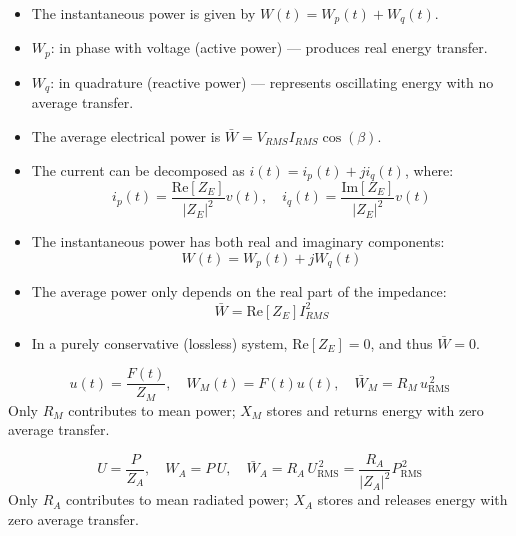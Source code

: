 \begin{tcolorbox}[colback=gray!5,colframe=gray!50!black,title=Key Points]
\begin{itemize}
    \item The instantaneous power is given by \( W(t) = W_p(t) + W_q(t) \).
    \item \( W_p \): in phase with voltage (active power) — produces real energy transfer.
    \item \( W_q \): in quadrature (reactive power) — represents oscillating energy with no average transfer.
    \item The average electrical power is \( \bar{W} = V_{RMS} I_{RMS} \cos(\beta) \).
\end{itemize}
\end{tcolorbox}


\begin{tcolorbox}[colback=gray!5,colframe=gray!50!black,title=Key Points]
\begin{itemize}
    \item The current can be decomposed as \( i(t) = i_p(t) + j i_q(t) \), where:
    \[
    i_p(t) = \frac{\mathrm{Re}[Z_E]}{|Z_E|^2} v(t), \quad i_q(t) = \frac{\mathrm{Im}[Z_E]}{|Z_E|^2} v(t)
    \]
    \item The instantaneous power has both real and imaginary components:
    \[
    W(t) = W_p(t) + j W_q(t)
    \]
    \item The average power only depends on the real part of the impedance:
    \[
    \bar{W} = \mathrm{Re}[Z_E] I_{RMS}^2
    \]
    \item In a purely conservative (lossless) system, \( \mathrm{Re}[Z_E] = 0 \), and thus \( \bar{W} = 0 \).
\end{itemize}
\end{tcolorbox}

\begin{tcolorbox}[colback=gray!5,colframe=gray!50!black,title=Key results (mechanical domain)]
\[
\boxed{\,u(t)=\dfrac{F(t)}{Z_M},\quad
W_M(t)=F(t)u(t),\quad
\bar W_M=R_M\,u_{\mathrm{RMS}}^{\,2}\,}
\]
Only \(R_M\) contributes to mean power; \(X_M\) stores and returns energy with zero average transfer.
\end{tcolorbox}

\begin{tcolorbox}[colback=gray!5,colframe=gray!50!black,title=Key results (acoustical domain)]
\[
\boxed{\,U=\dfrac{P}{Z_A},\quad W_A=P\,U,\quad
\bar W_A=R_A\,U_{\mathrm{RMS}}^{\,2}
=\dfrac{R_A}{|Z_A|^2}P_{\mathrm{RMS}}^{\,2}\,}
\]
Only \(R_A\) contributes to mean radiated power; \(X_A\) stores and releases energy with zero average transfer.
\end{tcolorbox}


